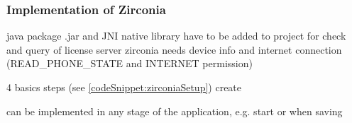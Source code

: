 \subsubsection{Implementation of Zirconia} \label{section:license-samsung-implementation}
java package .jar and JNI native library have to be added to project
for check and query of license server zirconia needs device info and internet connection (READ\_PHONE\_STATE and INTERNET permission)

4 basics steps (see \ref{codeSnippet:zirconiaSetup})
create

can be implemented in any stage of the application, e.g. start or when saving

\cite{samsungZirconia}
%





